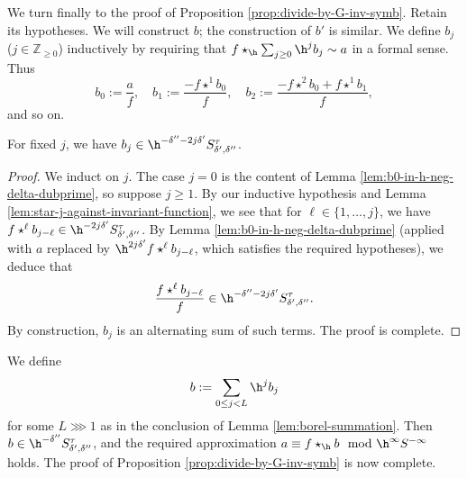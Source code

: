 We turn finally to the proof of Proposition \ref{prop:divide-by-G-inv-symb}.  Retain its hypotheses.  We will construct $b$; the construction of $b'$ is similar.  We define $b_j$ ($j \in \mathbb{Z}_{\geq 0}$) inductively by requiring that $f \star_{\h} \sum_{j \geq 0} \h^j b_j \sim a$ in a formal sense.  Thus
\[
  b_0 := \frac{a}{f}, \quad b_1 := \frac{- f \star^1 b_0}{f}, \quad b_2 := \frac{- f \star^2 b_0 + f \star^1 b_1}{f},
\]
and so on.
\begin{lemma}
  For fixed $j$, we have $b_j \in \h^{-\delta '' - 2 j \delta '} S^\tau_{\delta ', \delta ''}$.
\end{lemma}
\begin{proof}
  We induct on $j$.  The case $j=0$ is the content of Lemma \ref{lem:b0-in-h-neg-delta-dubprime}, so suppose $j \geq 1$.  By our inductive hypothesis and Lemma \ref{lem:star-j-against-invariant-function}, we see that for $\ell \in \{1, \dotsc, j\}$, we have $f \star^{\ell} b_{j - \ell} \in \h^{- 2 j \delta ' } S^\tau_{\delta ', \delta''}$.  By Lemma \ref{lem:b0-in-h-neg-delta-dubprime} (applied with $a$ replaced by $\h^{2 j \delta '} f \star^{\ell} b_{j - \ell}$, which satisfies the required hypotheses), we deduce that
  \[
    \frac{f \star^{\ell} b_{j - \ell}}{f} \in \h^{- \delta '' - 2 j \delta '} S^\tau_{\delta ', \delta ''}.
  \]
  By construction, $b_j$ is an alternating sum of such terms.  The proof is complete.
\end{proof}

We define
\[
  b := \sum_{0 \leq j < L} \h^j b_j
\]
for some $L \ggg 1$ as in the conclusion of Lemma \ref{lem:borel-summation}.  Then $b \in \h^{- \delta ''} S^\tau_{\delta ', \delta ''}$, and the required approximation $a \equiv f \star_{\h} b \mod{\h^\infty S^{-\infty}}$ holds.  The proof of Proposition \ref{prop:divide-by-G-inv-symb} is now complete.

